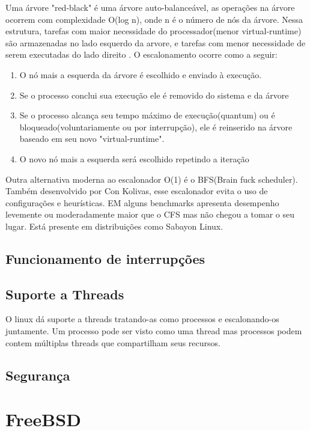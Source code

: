 \documentclass[conference]{IEEEtran}
\begin{document}
Uma árvore "red-black" é uma árvore auto-balanceável, as operações na árvore ocorrem com complexidade O(log n), onde n é o número de nós da árvore. Nessa estrutura, tarefas com maior necessidade do processador(menor virtual-runtime) são armazenadas no lado esquerdo da arvore, e tarefas com menor necessidade de serem executadas do lado direito \cite{LinuxSchedulerIBM}. O escalonamento ocorre como a seguir:
\begin{enumerate}
	\item O nó mais a esquerda da árvore é escolhido e enviado à execução.
	\item Se o processo conclui sua execução ele é removido do sistema e da árvore
	\item Se o processo alcança seu tempo máximo de execução(quantum) ou é bloqueado(voluntariamente ou por interrupção), ele é reinserido na árvore baseado em seu novo "virtual-runtime".
	\item O novo nó mais a esquerda será escolhido repetindo a iteração\cite{LinuxSchedulerWiki}
\end{enumerate}



Outra alternativa moderna ao escalonador O(1) é o BFS(Brain fuck scheduler). Também desenvolvido por Con Kolivas, esse escalonador evita o uso de configurações e heurísticas. EM alguns benchmarks apresenta desempenho levemente ou moderadamente maior que o CFS mas não chegou a tomar o seu lugar. Está presente em distribuições como Sabayon Linux\cite{LinuxSchedulerBFS}.
\cite{LinuxSchedulerWiki}

\subsection{Funcionamento de interrupções}\label{sec:LinuxInt}

\subsection{Suporte a Threads}\label{sec:LinuxThreads}
O linux dá suporte a threads tratando-as como processos e escalonando-os juntamente. Um processo pode ser visto como uma thread mas
processos podem contem múltiplas threads que compartilham seus recursos\cite{LinuxSchedulerIBM}.
\subsection{Segurança}\label{sec:LinuxSec}

\section{FreeBSD}\label{sec:BSD}
\end{document}
